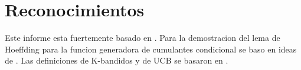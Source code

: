 \section{Reconocimientos}

Este informe esta fuertemente basado en \cite{mohri2018foundations}.
Para la demostracion del lema de Hoeffding para la funcion generadora de cumulantes condicional se baso en ideas de \cite[Lemma~4.9]{tropp2021probability}.
Las definiciones de K-bandidos y de UCB se basaron en \cite{sutton2018reinforcement}.